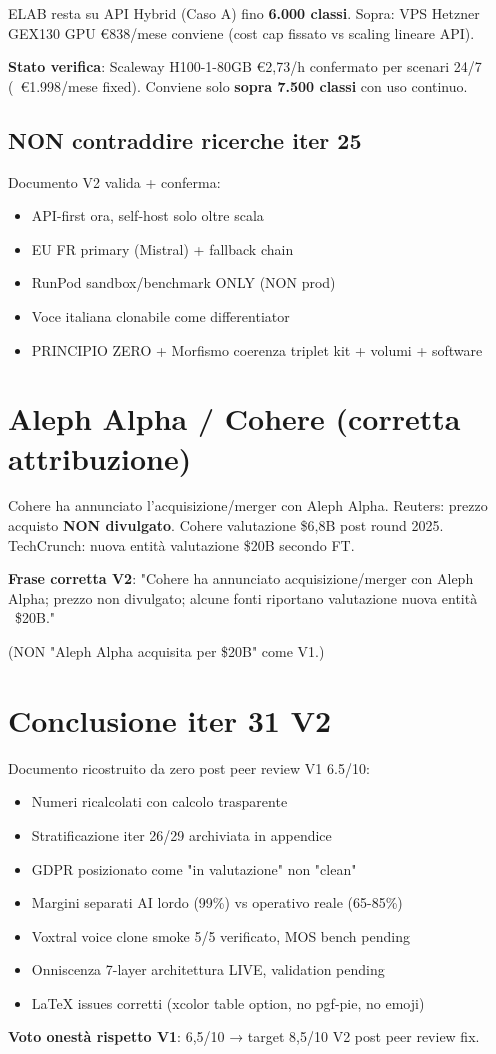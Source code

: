 \documentclass[12pt,a4paper]{article}
\begin{document}
ELAB resta su API Hybrid (Caso A) fino \textbf{6.000 classi}. Sopra: VPS Hetzner GEX130 GPU €838/mese conviene (cost cap fissato vs scaling lineare API).

\textbf{Stato verifica}: Scaleway H100-1-80GB \euro 2,73/h confermato per scenari 24/7 (~\euro 1.998/mese fixed). Conviene solo \textbf{sopra 7.500 classi} con uso continuo.

\subsection*{NON contraddire ricerche iter 25}

Documento V2 valida + conferma:
\begin{itemize}[leftmargin=*]
  \item API-first ora, self-host solo oltre scala
  \item EU FR primary (Mistral) + fallback chain
  \item RunPod sandbox/benchmark ONLY (NON prod)
  \item Voce italiana clonabile come differentiator
  \item PRINCIPIO ZERO + Morfismo coerenza triplet kit + volumi + software
\end{itemize}

\section{Aleph Alpha / Cohere (corretta attribuzione)}

Cohere ha annunciato l'acquisizione/merger con Aleph Alpha. Reuters: prezzo acquisto \textbf{NON divulgato}. Cohere valutazione \$6,8B post round 2025. TechCrunch: nuova entità valutazione \$20B secondo FT.

\textbf{Frase corretta V2}: "Cohere ha annunciato acquisizione/merger con Aleph Alpha; prezzo non divulgato; alcune fonti riportano valutazione nuova entità ~\$20B."

(NON "Aleph Alpha acquisita per \$20B" come V1.)

\section{Conclusione iter 31 V2}

Documento ricostruito da zero post peer review V1 6.5/10:
\begin{itemize}[leftmargin=*]
  \item Numeri ricalcolati con calcolo trasparente
  \item Stratificazione iter 26/29 archiviata in appendice
  \item GDPR posizionato come "in valutazione" non "clean"
  \item Margini separati AI lordo (99\%) vs operativo reale (65-85\%)
  \item Voxtral voice clone smoke 5/5 verificato, MOS bench pending
  \item Onniscenza 7-layer architettura LIVE, validation pending
  \item LaTeX issues corretti (xcolor table option, no pgf-pie, no emoji)
\end{itemize}

\textbf{Voto onestà rispetto V1}: 6,5/10 → target 8,5/10 V2 post peer review fix.
\end{document}

